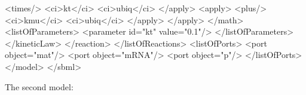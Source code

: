 \documentclass{cekarticle}
\begin{document}
\begin{example}
                            <times/>
                            <ci>kt</ci>
                            <ci>ubiq</ci>    
                        </apply>
                        <apply>
                            <plus/>
                            <ci>kmu</ci>
                            <ci>ubiq</ci>
                        </apply>
                    </apply>
                </math>
                <listOfParameters>
                    <parameter id="kt" value="0.1"/>
                </listOfParameters>
            </kineticLaw>
        </reaction>
    </listOfReactions>
    <listOfPorts>
        <port object="mat"/>
        <port object="mRNA"/>
        <port object="p"/>
    </listOfPorts>
</model>
</sbml>
\end{example}

The second model:
\end{document}
